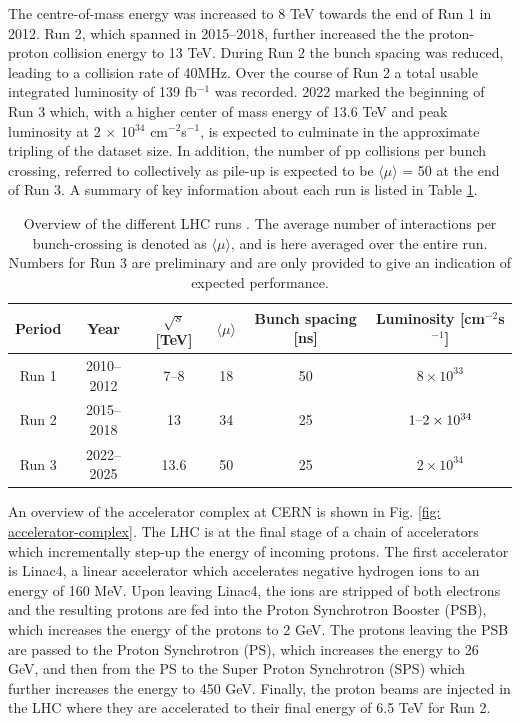 The centre-of-mass energy was increased to 8 TeV towards the end of Run 1 in 2012. Run 2, which spanned in 2015–2018, further increased the the proton-proton collision energy to 13 TeV. During Run 2 the bunch spacing was reduced, leading to a collision rate of 40MHz. Over the course of Run 2 a total usable integrated luminosity of 139 fb$^{−1}$ was recorded. 2022 marked the beginning of Run 3 which, with a higher center of mass energy of 13.6 TeV and peak luminosity at 2 $\times$ 10$^{34}$ cm$^{−2}$s$^{−1}$, is expected to culminate in the approximate tripling of the dataset size. In addition, the number of pp collisions per bunch crossing, referred to collectively as pile-up is expected to be $\langle \mu \rangle$ = 50 at the end of Run 3. A summary of key information about each run is listed in Table \ref{tab:lhc-runs}.

\begin{table}[!htbp]
  \footnotesize\centering
  \setlength{\tabcolsep}{0.5em} %
  \begin{tabular}{cc|cccc}
      \toprule
      \textbf{Period} & \textbf{Year} & $\sqrt{s}$ [TeV] 
      & $\langle \mu \rangle$ & \textbf{Bunch spacing} [ns] & \textbf{Luminosity} [cm$^{−2}$s$^{−1}$] \\
      \hline
      Run 1 & 2010--2012 & \SIrange[range-phrase=--,range-units=single,range-exponents=combine]{7}{8}{} & 18 & 50 & $8 \times 10^{33}$ \\
      Run 2 & 2015--2018 & \SI{13  }{} & 34 & 25 & $1\textnormal{--}2 \times 10^{34}$ \\
      Run 3 & 2022--2025 & \SI{13.6}{} & 50 & 25 & $2 \times 10^{34}$ \\
      \bottomrule
  \end{tabular}
  \caption{
    Overview of the different LHC runs \cite{atlas-lumi-run1,atlas-lumi-run2}.
    The average number of interactions per bunch-crossing is denoted as $\langle \mu \rangle$, and is here averaged over the entire run. Numbers for Run 3 are preliminary and are only provided to give an indication of expected performance.
  }
  \label{tab:lhc-runs}
\end{table}

An overview of the accelerator complex at CERN is shown in Fig. \ref{fig: accelerator-complex}. The LHC is at the final stage of a chain of accelerators which incrementally step-up the energy of incoming protons. The first accelerator is Linac4, a linear accelerator which accelerates negative hydrogen ions to an energy of 160 MeV. Upon leaving Linac4, the ions are stripped of both electrons and the resulting protons are fed into the Proton Synchrotron Booster (PSB), which increases the energy of the protons to 2 GeV. The protons leaving the PSB are passed to the Proton Synchrotron (PS), which increases the energy to 26 GeV, and then from the PS to the Super Proton Synchrotron (SPS) which further increases the energy to 450 GeV. Finally, the proton beams are injected in the LHC where they are accelerated to their final energy of 6.5 TeV for Run 2.

